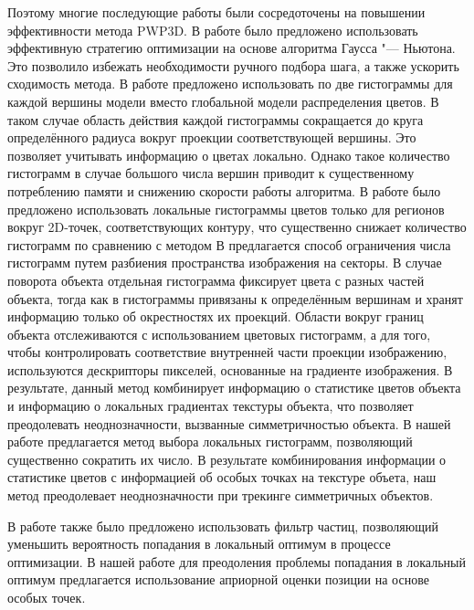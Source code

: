 Поэтому многие последующие работы были сосредоточены на повышении эффективности
метода PWP3D. В работе \cite{Tjaden2018} было предложено использовать
эффективную стратегию оптимизации на основе алгоритма Гаусса "--- Ньютона. Это
позволило избежать необходимости ручного
подбора шага, а также ускорить сходимость метода. В работе \cite{Tjaden2017}
предложено использовать по две гистограммы для каждой вершины модели вместо
глобальной модели распределения цветов. В таком случае область действия каждой
гистограммы сокращается до круга определённого радиуса вокруг проекции
соответствующей вершины. Это позволяет учитывать информацию о цветах локально.
Однако такое количество гистограмм в случае большого числа вершин приводит к
существенному потреблению памяти и снижению скорости работы алгоритма.
В работе \cite{Hexner2016} было предложено использовать локальные гистограммы
цветов только для регионов вокруг 2D-точек, соответствующих контуру, что
существенно снижает количество гистограмм по сравнению с методом
\cite{Tjaden2017}
В \cite{RegionPhotometric} предлагается способ ограничения числа гистограмм
путем разбиения пространства изображения на секторы. В случае поворота объекта
отдельная гистограмма фиксирует цвета с разных частей
объекта, тогда как в \cite{Tjaden2017} гистограммы привязаны к определённым
вершинам и хранят информацию только об окрестностях их проекций.
Области вокруг границ объекта отслеживаются с использованием цветовых
гистограмм, а для того, чтобы контролировать соответствие внутренней части
проекции изображению, используются дескрипторы пикселей, основанные на
градиенте изображения. В результате, данный метод комбинирует информацию о
статистике цветов объекта и информацию о локальных градиентах текстуры объекта,
что позволяет преодолевать неоднозначности, вызванные симметричностью объекта.
В нашей работе предлагается метод выбора локальных гистограмм, позволяющий
существенно сократить их число. 
В результате комбинирования информации о статистике цветов с информацией об
особых точках на текстуре объета, наш метод преодолевает неоднозначности при
трекинге симметричных объектов.

В работе \cite{Zhao2014} также было предложено использовать фильтр частиц,
позволяющий уменьшить вероятность попадания в локальный оптимум в процессе
оптимизации. В нашей работе для преодоления проблемы попадания в локальный
оптимум предлагается использование априорной оценки позиции на основе особых
точек.

